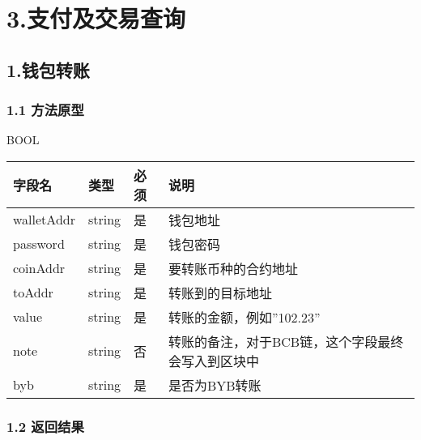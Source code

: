 \documentclass[letterpaper,10pt,english]{sphinxmanual}
\begin{document}
\section{3.支付及交易查询}
\label{\detokenize{BCBWalletSDK_u63a5_u53e3_u8bf4_u660e:id59}}

\subsection{1.钱包转账}
\label{\detokenize{BCBWalletSDK_u63a5_u53e3_u8bf4_u660e:id60}}

\subsubsection{1.1 方法原型}
\label{\detokenize{BCBWalletSDK_u63a5_u53e3_u8bf4_u660e:id61}}
BOOL



\begin{savenotes}\sphinxattablestart
\centering
\begin{tabulary}{\linewidth}[t]{|T|T|T|T|}
\hline
\sphinxstyletheadfamily 
字段名
&\sphinxstyletheadfamily 
类型
&\sphinxstyletheadfamily 
必须
&\sphinxstyletheadfamily 
说明
\\
\hline
walletAddr
&
string
&
是
&
钱包地址
\\
\hline
password
&
string
&
是
&
钱包密码
\\
\hline
coinAddr
&
string
&
是
&
要转账币种的合约地址
\\
\hline
toAddr
&
string
&
是
&
转账到的目标地址
\\
\hline
value
&
string
&
是
&
转账的金额，例如”102.23”
\\
\hline
note
&
string
&
否
&
转账的备注，对于BCB链，这个字段最终会写入到区块中
\\
\hline
byb
&
string
&
是
&
是否为BYB转账
\\
\hline
\end{tabulary}
\par
\sphinxattableend\end{savenotes}


\subsubsection{1.2 返回结果}
\label{\detokenize{BCBWalletSDK_u63a5_u53e3_u8bf4_u660e:id62}}
\end{document}
